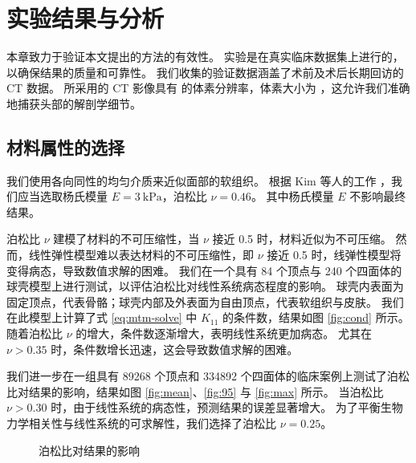 
\chapter{实验结果与分析}
\label{cha:results}

本章致力于验证本文提出的方法的有效性。
实验是在真实临床数据集上进行的，以确保结果的质量和可靠性。
我们收集的验证数据涵盖了术前及术后长期回访的 CT 数据。
所采用的 CT 影像具有  的体素分辨率，体素大小为 ，这允许我们准确地捕获头部的解剖学细节。

\section{材料属性的选择}

我们使用各向同性的均匀介质来近似面部的软组织。
根据 Kim 等人的工作 \cite{mollemansPredictingSoftTissue2007}，我们应当选取杨氏模量 $E = \SI{3}{\kilo\pascal}$，泊松比 $\nu = \num{0.46}$。
其中杨氏模量 $E$ 不影响最终结果。

泊松比 $\nu$ 建模了材料的不可压缩性，当 $\nu$ 接近 \num{0.5} 时，材料近似为不可压缩。
然而，线性弹性模型难以表达材料的不可压缩性，即 $\nu$ 接近 \num{0.5} 时，线弹性模型将变得病态，导致数值求解的困难。
我们在一个具有 \num{84} 个顶点与 \num{240} 个四面体的球壳模型上进行测试，以评估泊松比对线性系统病态程度的影响。
球壳内表面为固定顶点，代表骨骼；球壳内部及外表面为自由顶点，代表软组织与皮肤。
我们在此模型上计算了式 \eqref{eq:mtm-solve} 中 $K_{11}$ 的条件数，结果如图 \ref{fig:cond} 所示。
随着泊松比 $\nu$ 的增大，条件数逐渐增大，表明线性系统更加病态。
尤其在 $\nu > 0.35$ 时，条件数增长迅速，这会导致数值求解的困难。

我们进一步在一组具有 \num{89268} 个顶点和 \num{334892} 个四面体的临床案例上测试了泊松比对结果的影响，结果如图 \ref{fig:mean}、\ref{fig:95} 与 \ref{fig:max} 所示。
当泊松比 $\nu > 0.30$ 时，由于线性系统的病态性，预测结果的误差显著增大。
为了平衡生物力学相关性与线性系统的可求解性，我们选择了泊松比 $\nu = 0.25$。

\begin{figure}[H]
  \centering
  \caption{泊松比对结果的影响}
\end{figure}


